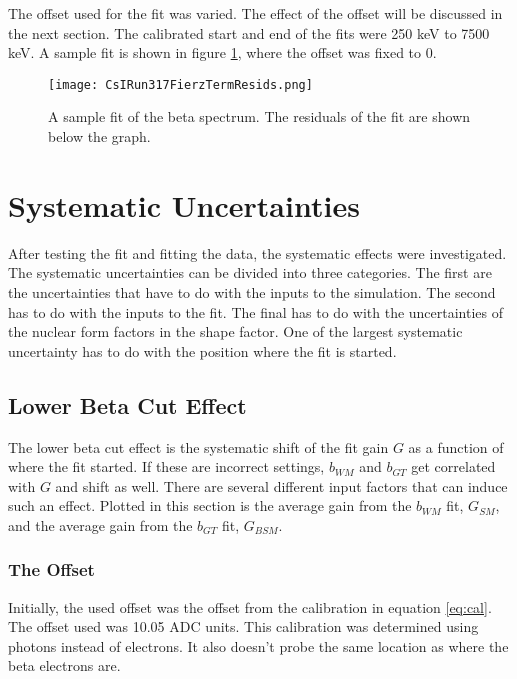 \documentclass[../MaxHughesThesis.tex]{subfiles}
\begin{document}
The offset used for the fit was varied.
The effect of the offset will be discussed in the next section. 
The calibrated start and end of the fits were 250 keV to 7500 keV. 
A sample fit is shown in figure \ref{fig:samplefit}, where the offset was fixed to 0.

\begin{figure}[!htb]
	\centerline{\texttt{[image: CsIRun317FierzTermResids.png]}}
	\caption{A sample fit of the beta spectrum. 
		 The residuals of the fit are shown below the graph.}
	\label{fig:samplefit}
\end{figure}

\section{Systematic Uncertainties}

After testing the fit and fitting the data, the systematic effects were investigated.
The systematic uncertainties can be divided into three categories.
The first  are the uncertainties that have to do with the inputs to the simulation.
The second  has to do with the inputs to the fit.
The final  has to do with the uncertainties of the nuclear form factors in the shape factor. 
One of the largest systematic uncertainty has to do with the position where the fit is started. 

\subsection{Lower Beta Cut Effect}

The lower beta cut effect is the systematic shift of the fit gain $G$ as a function of where the fit started.
If these are incorrect settings, $b_{WM}$ and $b_{GT}$ get correlated with $G$ and shift as well.
There are several different input factors that can induce such an effect.
Plotted in this section is the average gain from the $b_{WM}$ fit, $G_{SM}$, and the average gain from the $b_{GT}$ fit, $G_{BSM}$.

\subsubsection{The Offset}
Initially, the used offset was the offset from the calibration in equation \ref{eq:cal}.
The offset used was 10.05 ADC units.
This calibration was determined using photons instead of electrons.
It also doesn't probe the same location as where the beta electrons are.
\end{document}
